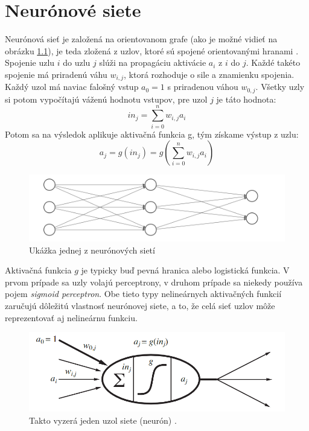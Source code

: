 \chapter{Neurónové siete}


Neurónová sieť je založená na orientovanom grafe (ako je možné vidieť na obrázku \ref{fig:nn}), je teda zložená z uzlov, ktoré sú spojené orientovanými hranami \citep{rnn:spol}.
Spojenie uzlu $i$ do uzlu $j$ slúži na propagáciu aktivácie $a_i$ z $i$ do $j$.
Každé takéto spojenie má priradenú váhu $w_{i,j}$, ktorá rozhoduje o sile a znamienku spojenia.
Každý uzol má naviac falošný vstup $a_0=1$ s priradenou váhou $w_{0,j}$.
Všetky uzly si potom vypočítajú váženú hodnotu vstupov, pre uzol $j$ je táto hodnota:
$$in_j=\sum^n_{i=0}w_{i,j}a_i$$
Potom sa na výsledok aplikuje aktivačná funkcia g, tým získame výstup z uzlu:
$$a_j=g(in_j)=g\left(\sum^n_{i=0}w_{i,j}a_i\right)$$

\begin{figure} [h!]
\includegraphics[width=\textwidth]{../img/nn.png}
\caption{Ukážka jednej z neurónových sietí}
\label{fig:nn}
\end{figure}

Aktivačná funkcia $g$ je typicky buď pevná hranica alebo logistická funkcia.
V prvom prípade sa uzly volajú perceptrony, v druhom prípade sa niekedy používa pojem \textit{sigmoid perceptron}.
Obe tieto typy nelineárnych aktivačných funkcií zaručujú dôležitú vlastnosť neurónovej siete, a to, že celá sieť uzlov môže reprezentovať aj nelineárnu funkciu.

\begin{figure} [h!]
\includegraphics[width=\textwidth]{../img/nn_aima_neuron.png}
\caption{Takto vyzerá jeden uzol siete (neurón) \citep{aima}.}
\end{figure}

